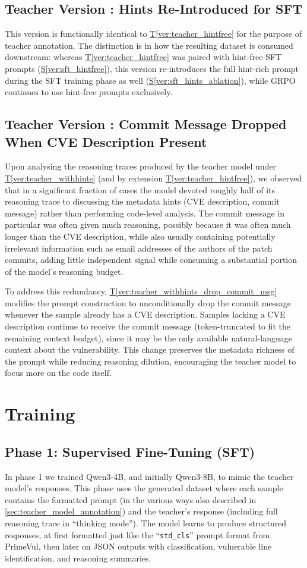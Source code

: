 \documentclass[12pt,a4paper]{article}
\makeatletter
\newcounter{TeacherVer}
\newcommand{\teacherversion}[2]{%
  \stepcounter{TeacherVer}%
  \subsection{Teacher Version \theTeacherVer: #1}%
  \protected@edef\@currentlabel{\theTeacherVer}\label{#2}%
}
\makeatother
\begin{document}
\teacherversion{Hints Re-Introduced for SFT}{ver:teacher_withhints}
This version is functionally identical to \hyperref[ver:teacher_hintfree]{T\ref*{ver:teacher_hintfree}} for the purpose of teacher annotation. The distinction is in how the resulting dataset is consumed downstream: whereas \hyperref[ver:teacher_hintfree]{T\ref*{ver:teacher_hintfree}} was paired with hint-free SFT prompts (\hyperref[ver:sft_hintfree]{S\ref*{ver:sft_hintfree}}), this version re-introduces the full hint-rich prompt during the SFT training phase as well (\hyperref[ver:sft_hints_ablation]{S\ref*{ver:sft_hints_ablation}}), while GRPO continues to use hint-free prompts exclusively.

\teacherversion{Commit Message Dropped When CVE Description Present}{ver:teacher_withhints_drop_commit_msg}
Upon analysing the reasoning traces produced by the teacher model under \hyperref[ver:teacher_withhints]{T\ref*{ver:teacher_withhints}} (and by extension \hyperref[ver:teacher_hintfree]{T\ref*{ver:teacher_hintfree}}), we observed that in a significant fraction of cases the model devoted roughly half of its reasoning trace to discussing the metadata hints (CVE description, commit message) rather than performing code-level analysis. The commit message in particular was often given much reasoning, possibly because it was often much longer than the CVE description, while also usually containing potentially irrelevant information such as email addresses of the authors of the patch commits, adding little independent signal while consuming a substantial portion of the model's reasoning budget.

To address this redundancy, \hyperref[ver:teacher_withhints_drop_commit_msg]{T\ref*{ver:teacher_withhints_drop_commit_msg}} modifies the prompt construction to unconditionally drop the commit message whenever the sample already has a CVE description. Samples lacking a CVE description continue to receive the commit message (token-truncated to fit the remaining context budget), since it may be the only available natural-language context about the vulnerability. This change preserves the metadata richness of the prompt while reducing reasoning dilution, encouraging the teacher model to focus more on the code itself.

\section{Training}


\subsection{Phase 1: Supervised Fine-Tuning (SFT)}
In phase 1 we trained Qwen3-4B, and initially Qwen3-8B, to mimic the teacher model's responses. This phase uses the generated dataset where each sample contains the formatted prompt (in the various ways also described in \ref{sec:teacher_model_annotation}) and the teacher's response (including full reasoning trace in ``thinking mode''). The model learns to produce structured responses, at first formatted just like the ``\texttt{std\_cls}'' prompt format from PrimeVul\cite{primevul}, then later on JSON outputs with classification, vulnerable line identification, and reasoning summaries.
\end{document}
